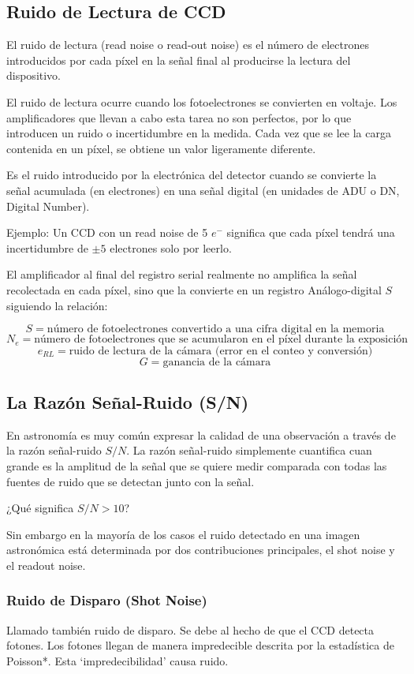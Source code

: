 \documentclass{article}
\begin{document}
\subsection{Ruido de Lectura de CCD}
El ruido de lectura (read noise o read-out noise) es el número de electrones introducidos por cada píxel en la señal final al producirse la lectura del dispositivo.

El ruido de lectura ocurre cuando los fotoelectrones se convierten en voltaje. Los amplificadores que llevan a cabo esta tarea no son perfectos, por lo que introducen un ruido o incertidumbre en la medida. Cada vez que se lee la carga contenida en un píxel, se obtiene un valor ligeramente diferente.

Es el ruido introducido por la electrónica del detector cuando se convierte la señal acumulada (en electrones) en una señal digital (en unidades de ADU o DN, Digital Number).

Ejemplo: Un CCD con un read noise de 5 $e^-$ significa que cada píxel tendrá una incertidumbre de $\pm 5$ electrones solo por leerlo.

El amplificador al final del registro serial realmente no amplifica la señal recolectada en cada píxel, sino que la convierte en un registro Análogo-digital $S$ siguiendo la relación:

$$ S = \text{número de fotoelectrones convertido a una cifra digital en la memoria} $$
$$ N_e = \text{número de fotoelectrones que se acumularon en el píxel durante la exposición} $$
$$ e_{RL} = \text{ruido de lectura de la cámara (error en el conteo y conversión)} $$
$$ G = \text{ganancia de la cámara} $$


\subsection{La Razón Señal-Ruido (S/N)}
En astronomía es muy común expresar la calidad de una observación a través de la razón señal-ruido $S/N$. La razón señal-ruido simplemente cuantifica cuan grande es la amplitud de la señal que se quiere medir comparada con todas las fuentes de ruido que se detectan junto con la señal.

¿Qué significa $S/N > 10$?

Sin embargo en la mayoría de los casos el ruido detectado en una imagen astronómica está determinada por dos contribuciones principales, el shot noise y el readout noise.

\subsubsection{Ruido de Disparo (Shot Noise)}
Llamado también ruido de disparo. Se debe al hecho de que el CCD detecta fotones. Los fotones llegan de manera impredecible descrita por la estadística de Poisson*. Esta `impredecibilidad' causa ruido.
\end{document}
